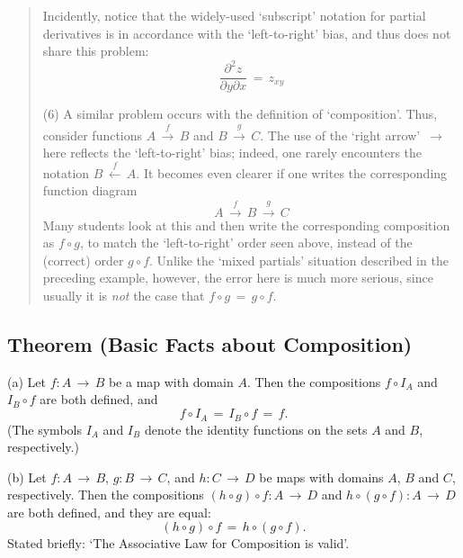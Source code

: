 \begin{quotation}
{        Incidently, notice that the widely-used `subscript' notation for partial derivatives is in accordance with the `left-to-right' bias, and thus does not share this problem:
        \begin{displaymath}
        \frac{{\partial}^{2}z}{{\partial}y{\partial}x} \,=\, z_{xy}
        \end{displaymath}

\V

        (6) A similar problem occurs with the definition of `composition'. Thus, consider functions $A \stackrel{f}{ \,{\rightarrow}\, }B$ and $B  \stackrel{g}{ \,{\rightarrow}\, }C$.
    The use of the `right arrow' $ \,{\rightarrow}\, $ here reflects the `left-to-right' bias;
    indeed, one rarely encounters the notation $B \stackrel{f}{ \,{\leftarrow}\, }A$.
    It becomes even clearer if one writes the corresponding function diagram
        \begin{displaymath}
       A \stackrel{f}{ \,{\rightarrow}\, } B \stackrel{g}{ \,{\rightarrow}\, } C
        \end{displaymath}
    Many students look at this and then write the corresponding composition as $f{\circ}g$,
    to match the `left-to-right' order seen above, instead of the (correct) order $g{\circ}f$.
    Unlike the `mixed partials' situation described in the preceding example, however,
    the error here is much more serious, since usually it is {\em not} the case that $f{\circ}g \,=\, g{\circ}f$.
}%
\end{quotation} 

\VV

        \subsection{\small{{\bf Theorem (Basic Facts about Composition)}}}
        \label{ThmA30.160}

\hspace*{\parindent}
        (a) Let $f:A \,{\rightarrow}\, B$ be a map with domain $A$.
    Then the compositions $f{\circ}I_{A}$ and $I_{B}{\circ}f$ are both defined, and
        \begin{displaymath}
        f{\circ}I_{A} \,=\, I_{B}{\circ}f \,=\, f.
        \end{displaymath}
    (The symbols $I_{A}$ and $I_{B}$ denote the identity functions on the sets $A$ and $B$, respectively.)

\V

        (b) Let $f:A \,{\rightarrow}\, B$, $g:B \,{\rightarrow}\, C$, and $h:C \,{\rightarrow}\, D$ be maps with domains $A$, $B$ and $C$, respectively.
    Then the compositions $(h{\circ}g){\circ}f:A \,{\rightarrow}\, D$ and $h{\circ}(g{\circ}f):A \,{\rightarrow}\, D$ are both defined, and they are equal:
        \begin{displaymath}
        (h{\circ}g){\circ}f \,=\, h{\circ}(g{\circ}f).
        \end{displaymath}
    Stated briefly: `The Associative Law for Composition is valid'.

